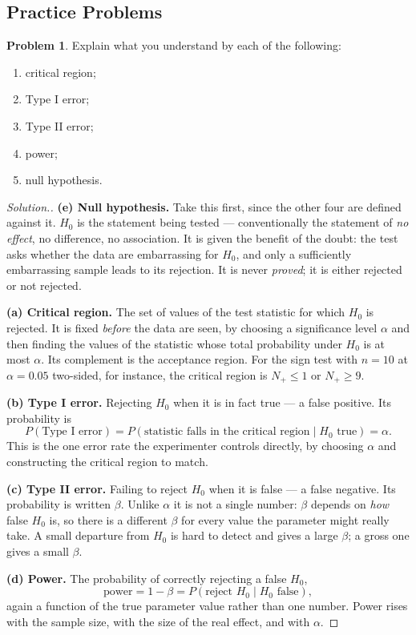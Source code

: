 \documentclass[11pt,a4paper]{article}
\theoremstyle{definition}
\newtheorem{problemx}{Problem}[section]
\newenvironment{problem}{\begin{problemx}}{\end{problemx}}
\newenvironment{solution}
  {\renewcommand{\qedsymbol}{}\begin{proof}[\textit{Solution}.]}
  {\end{proof}}
\begin{document}
\pagebreak
\subsection{Practice Problems}

\begin{problem}
Explain what you understand by each of the following:
\begin{enumerate}
\item[(a).] critical region;
\item[(b).] Type I error;
\item[(c).] Type II error;
\item[(d).] power;
\item[(e).] null hypothesis.
\end{enumerate}
\end{problem}

\begin{solution}
\textbf{(e) Null hypothesis.} Take this first, since the other four are defined
against it. $H_0$ is the statement being tested --- conventionally the statement of
\emph{no effect}, no difference, no association. It is given the benefit of the
doubt: the test asks whether the data are embarrassing for $H_0$, and only a
sufficiently embarrassing sample leads to its rejection. It is never
\emph{proved}; it is either rejected or not rejected.

\textbf{(a) Critical region.} The set of values of the test statistic for which
$H_0$ is rejected. It is fixed \emph{before} the data are seen, by choosing a
significance level $\alpha$ and then finding the values of the statistic whose
total probability under $H_0$ is at most $\alpha$. Its complement is the
acceptance region. For the sign test with $n=10$ at $\alpha=0.05$ two-sided, for
instance, the critical region is $N_+\leq 1$ or $N_+\geq 9$.

\textbf{(b) Type I error.} Rejecting $H_0$ when it is in fact true --- a false
positive. Its probability is
$$P(\text{Type I error})=P\left(\text{statistic falls in the critical region}
\mid H_0 \text{ true}\right)=\alpha .$$
This is the one error rate the experimenter controls directly, by choosing
$\alpha$ and constructing the critical region to match.

\textbf{(c) Type II error.} Failing to reject $H_0$ when it is false --- a false
negative. Its probability is written $\beta$. Unlike $\alpha$ it is not a single
number: $\beta$ depends on \emph{how} false $H_0$ is, so there is a different
$\beta$ for every value the parameter might really take. A small departure from
$H_0$ is hard to detect and gives a large $\beta$; a gross one gives a small
$\beta$.

\textbf{(d) Power.} The probability of correctly rejecting a false $H_0$,
$$\text{power}=1-\beta=P\left(\text{reject } H_0 \mid H_0 \text{ false}\right),$$
again a function of the true parameter value rather than one number. Power rises
with the sample size, with the size of the real effect, and with $\alpha$.
\end{solution}
\end{document}
